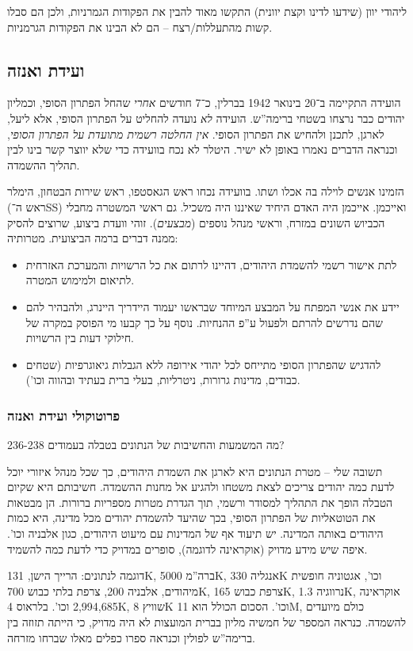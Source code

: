 \documentclass[a4paper]{book}
\begin{document}
	ליהודי יוון (שידעו לדינו וקצת יוונית) התקשו מאוד להבין את הפקודות הגמרניות, ולכן הם סבלו קשות מהתעללות/רצח – הם לא הבינו את הפקודות הגרמניות. 
	
	\subsection{ועידת ואנזה}
	הועידה התקיימה ב־20 בינואר 1942 בברלין, כ־7 חודשים \textit{אחרי} שהחל הפתרון הסופי, וכמליון יהודים כבר נרצחו בשטחי ברימה''ש. הועידה \textit{לא} נועדה להחליט על הפתרון הסופי, אלא ליעל, לארגן, לתכנן ולהחיש את הפתרון הסופי. \textit{אין החלטה רשמית מתועדת על הפתרון הסופי}, וכנראה הדברים נאמרו באופן לא ישיר. היטלר לא נכח בוועידה כדי שלא יווצר קשר בינו לבין תהליך ההשמדה. 
	
	הזמינו אנשים לוילה בה אכלו ושתו. בוועידה נכחו ראש הגאסטפו, ראש שירות הבטחון, הימלר (ראש ה־SS) ואייכמן. אייכמן היה האדם היחיד שאיננו היה משכיל. גם ראשי המשטרה מחבלי הכביוש השונים במזרח, וראשי מנהל נוספים (\textit{מבצעים}). זוהי וועדת ביצוע, שרוצים להסיק ממנה דברים ברמה הביצועית. מטרותיה: 
	\begin{itemize}
		\item לתת אישור רשמי להשמדת היהודים, דהיינו לרתום את כל הרשויות והמערכת האזרחית לתיאום ולמימוש המטרה. 
		\item יידע את אנשי המפתח על המבצע המיוחד שבראשו יעמוד היידריך היינרג, ולהבהיר להם שהם נדרשים להרתם ולפעול ע''פ ההנחיות. נוסף על כך קבעו מי הפוסק במקרה של חילוקי דעות בין הרשויות. 
		\item להדגיש שהפתרון הסופי מתייחס לכל יהודי אירופה ללא הגבלות גיאוגרפיות (שטחים כבודים, מדינות גרורות, ניטרליות, בעלי ברית בעתיד ובהווה וכו'). 
	\end{itemize}
	
	\subsubsection{פרוטוקולי ועידת ואנזה}
	מה המשמעות והחשיבות של הנתונים בטבלה בעמודים 236-238? 
	
	תשובה שלי – מטרת הנתונים היא לארגן את השמדת היהודים, כך שכל מנהל איזורי יוכל לדעת כמה יהודים צריכים לצאת משטחו ולהגיע אל מחנות ההשמדה. חשיבותם היא שקיום הטבלה הופך את התהליך למסודר ורשמי, תוך הגדרת מטרות מספריות ברורות. הן מבטאות את הטוטאליות של הפתרון הסופי, בכך שהיעד להשמדת יהודים מכל מדינה, היא כמות היהודים באותה המדינה. יש תיעוד אף של המדינות עם מיעוט היהודים, כגון אלבניה וכו'. איפה שיש מידע מדויק (אוקראינה לדוגמה), סופרים במדויק כדי לדעת כמה להשמיד. 
	
	דוגמה לנתונים: הרייך הישן, 131K, ברה''מ 5000K, אנגליה 330K וכו', אגטוניה חופשית מיהודים, אלבניה 200, צרפת בלתי כבוש 700K, צרפת כבוש 165K, נרווגיה 1.3K, אוקראינה 2,994,685 וכו'. בלראוס 4K, שוויץ 8K וכו'. הסכום הכולל הוא 11M, כולם מיועדים להשמדה. כנראה המספר של חמשיה מליון בברית המועצות לא היה מדויק, כי הייתה תזוזה בין ברימה''ש לפולין וכנראה ספרו כפלים מאלו שברחו מזרחה. 
	
\end{document}
